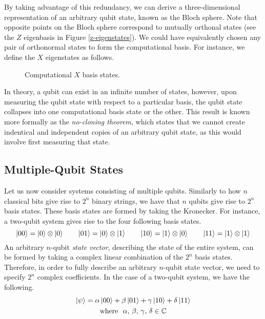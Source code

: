 By taking advantage of this redundancy, we can derive a three-dimensional representation of an arbitrary qubit state, known as the Bloch sphere. Note that opposite points on the Bloch sphere correspond to mutually orthonal states (see the $Z$ eigenbasis in Figure \ref{z-eigenstates}). We could have equivalently chosen any pair of orthonormal states to form the computational basis. For instance, we define the $X$ eigenstates as follows.

\begin{figure}[H]
    \centering
    \begin{minipage}{.45\textwidth}
        \centering
    \end{minipage}%
    \begin{minipage}{0.45\textwidth}
        \centering
    \end{minipage}
    \caption{Computational $X$ basis states.}
    \label{x-eigenstates}
\end{figure}

In theory, a qubit can exist in an infinite number of states, however, upon measuring the qubit state with respect to a particular basis, the qubit state collapses into one computational basis state or the other. This result is known more formally as the \textit{no-cloning theorem}, which states that we cannot create indentical and independent copies of an arbitrary qubit state, as this would involve first measuring that state.

\subsection{Multiple-Qubit States}

Let us now consider systems consisting of multiple qubits. Similarly to how $n$ classical bits give rise to $2^n$ binary strings, we have that $n$ qubits give rise to $2^n$ basis states. These basis states are formed by taking the Kronecker. For instance, a two-qubit system gives rise to the four following basis states.
\begin{equation*}
    \ket{00} = \ket 0 \otimes \ket 0 \qquad
    \ket{01} = \ket 0 \otimes \ket 1 \qquad
    \ket{10} = \ket 1 \otimes \ket 0 \qquad
    \ket{11} = \ket 1 \otimes \ket 1
\end{equation*}
An arbitrary $n$-qubit \textit{state vector}, describing the state of the entire system, can be formed by taking a complex linear combination of the $2^n$ basis states. Therefore, in order to fully describe an arbitrary $n$-qubit state vector, we need to specify $2^n$ complex coefficients. In the case of a two-qubit system, we have the following.
\begin{gather*}
    \ket\psi =
    \alpha \ket{00} +
    \beta \ket{01} +
    \gamma \ket{10} +
    \delta \ket{11} \\
    \text{where} \,\,\,\, \alpha, \, \beta, \, \gamma, \, \delta \in \mathbb{C}
\end{gather*}

